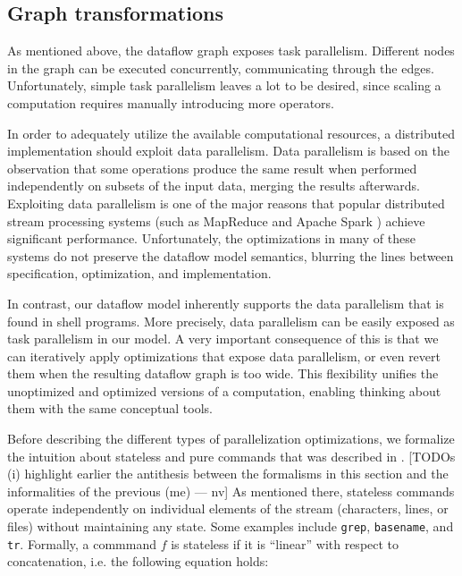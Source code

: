 \documentclass[sigplan,10pt,review,anonymous]{acmart}
\newcommand{\ttt}[1]{\texttt{\small #1}}
\newcommand{\nv}[1]{[{\color{cyan}#1 --- nv}]}
\begin{document}
\subsection{Graph transformations}
\label{ir:transformations}

As mentioned above, the dataflow graph exposes task
parallelism. Different nodes in the graph can be executed
concurrently, communicating through the edges.
Unfortunately, simple task parallelism leaves a lot to be desired,
since scaling a computation requires manually introducing more
operators.

In order to adequately utilize the available computational resources,
a distributed implementation should exploit data parallelism. Data
parallelism is based on the observation that some operations produce
the same result when performed independently on subsets of the input
data, merging the results afterwards. Exploiting data parallelism is
one of the major reasons that popular distributed stream processing
systems (such as MapReduce \cite{DG2004MR} and Apache Spark
\cite{spark:12}) achieve significant performance. Unfortunately, the
optimizations in many of these systems do not preserve the dataflow
model semantics, blurring the lines between specification,
optimization, and implementation.

In contrast, our dataflow model inherently supports the data
parallelism that is found in shell programs. More precisely, data
parallelism can be easily exposed as task parallelism in our model. A
very important consequence of this is that we can iteratively apply
optimizations that expose data parallelism, or even revert them when
the resulting dataflow graph is too wide. This flexibility unifies the
unoptimized and optimized versions of a computation, enabling thinking
about them with the same conceptual tools.

Before describing the different types of parallelization
optimizations, we formalize the intuition about stateless and pure
commands that was described in .
\nv{TODOs
  (i) highlight earlier the antithesis between the formalisms in this section and the informalities of the previous (me)
}
%
As mentioned there, stateless commands operate independently on
individual elements of the stream (characters, lines, or files)
without maintaining any state. Some examples include \ttt{grep},
\ttt{basename}, and \ttt{tr}. Formally, a commmand $f$ is stateless if
it is ``linear'' with respect to concatenation, i.e. the following
equation holds:
\end{document}
